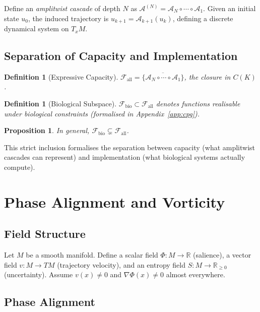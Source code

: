 \documentclass[12pt, a4paper]{article}
\newtheorem{definition}[theorem]{Definition}
\newtheorem{proposition}[theorem]{Proposition}
\theoremstyle{remark}
\theoremstyle{definition}
\begin{document}
Define an \emph{amplitwist cascade} of depth $N$ as
$\mathcal{A}^{(N)} = \mathcal{A}_N \circ \cdots \circ \mathcal{A}_1$.
Given an initial state $u_0$, the induced trajectory is $u_{k+1} = \mathcal{A}_{k+1}(u_k)$,
defining a discrete dynamical system on $T_x M$.

\subsection{Separation of Capacity and Implementation}

\begin{definition}[Expressive Capacity]
$\mathcal{F}_{\mathrm{all}} = \overline{\{\mathcal{A}_N \circ \cdots \circ \mathcal{A}_1\}}$,
the closure in $C(K)$.
\end{definition}

\begin{definition}[Biological Subspace]
$\mathcal{F}_{\mathrm{bio}} \subset \mathcal{F}_{\mathrm{all}}$ denotes functions realisable
under biological constraints (formalised in Appendix~\ref{app:cpg}).
\end{definition}

\begin{proposition}
In general, $\mathcal{F}_{\mathrm{bio}} \subsetneq \mathcal{F}_{\mathrm{all}}$.
\end{proposition}

This strict inclusion formalises the separation between capacity (what amplitwist cascades
can represent) and implementation (what biological systems actually compute).

\section{Phase Alignment and Vorticity}
\label{app:phase}

\subsection{Field Structure}

Let $M$ be a smooth manifold.  Define a scalar field $\Phi \colon M \to \mathbb{R}$
(salience), a vector field $v \colon M \to TM$ (trajectory velocity), and an entropy
field $S \colon M \to \mathbb{R}_{\ge 0}$ (uncertainty).  Assume $v(x) \neq 0$ and
$\nabla\Phi(x) \neq 0$ almost everywhere.

\subsection{Phase Alignment}
\end{document}
